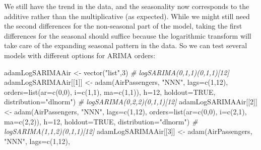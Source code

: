 \documentclass[
]{book}
\newenvironment{Shaded}{\begin{snugshade}}{\end{snugshade}}
\newcommand{\AttributeTok}[1]{\textcolor[rgb]{0.77,0.63,0.00}{#1}}
\newcommand{\CommentTok}[1]{\textcolor[rgb]{0.56,0.35,0.01}{\textit{#1}}}
\newcommand{\ConstantTok}[1]{\textcolor[rgb]{0.00,0.00,0.00}{#1}}
\newcommand{\DecValTok}[1]{\textcolor[rgb]{0.00,0.00,0.81}{#1}}
\newcommand{\FunctionTok}[1]{\textcolor[rgb]{0.00,0.00,0.00}{#1}}
\newcommand{\NormalTok}[1]{#1}
\newcommand{\OtherTok}[1]{\textcolor[rgb]{0.56,0.35,0.01}{#1}}
\newcommand{\StringTok}[1]{\textcolor[rgb]{0.31,0.60,0.02}{#1}}
\theoremstyle{definition}
\theoremstyle{definition}
\theoremstyle{definition}
\theoremstyle{definition}
\theoremstyle{remark}
\begin{document}
We still have the trend in the data, and the seasonality now corresponds to the additive rather than the multiplicative (as expected). While we might still need the second differences for the non-seasonal part of the model, taking the first differences for the seasonal should suffice because the logarithmic transform will take care of the expanding seasonal pattern in the data. So we can test several models with different options for ARIMA orders:

\begin{Shaded}
\begin{Highlighting}[]
\NormalTok{adamLogSARIMAAir }\OtherTok{\textless{}{-}} \FunctionTok{vector}\NormalTok{(}\StringTok{"list"}\NormalTok{,}\DecValTok{3}\NormalTok{)}
\CommentTok{\# logSARIMA(0,1,1)(0,1,1)[12]}
\NormalTok{adamLogSARIMAAir[[}\DecValTok{1}\NormalTok{]] }\OtherTok{\textless{}{-}}
  \FunctionTok{adam}\NormalTok{(AirPassengers, }\StringTok{"NNN"}\NormalTok{, }\AttributeTok{lags=}\FunctionTok{c}\NormalTok{(}\DecValTok{1}\NormalTok{,}\DecValTok{12}\NormalTok{),}
       \AttributeTok{orders=}\FunctionTok{list}\NormalTok{(}\AttributeTok{ar=}\FunctionTok{c}\NormalTok{(}\DecValTok{0}\NormalTok{,}\DecValTok{0}\NormalTok{), }\AttributeTok{i=}\FunctionTok{c}\NormalTok{(}\DecValTok{1}\NormalTok{,}\DecValTok{1}\NormalTok{), }\AttributeTok{ma=}\FunctionTok{c}\NormalTok{(}\DecValTok{1}\NormalTok{,}\DecValTok{1}\NormalTok{)),}
       \AttributeTok{h=}\DecValTok{12}\NormalTok{, }\AttributeTok{holdout=}\ConstantTok{TRUE}\NormalTok{, }\AttributeTok{distribution=}\StringTok{"dlnorm"}\NormalTok{)}
\CommentTok{\# logSARIMA(0,2,2)(0,1,1)[12]}
\NormalTok{adamLogSARIMAAir[[}\DecValTok{2}\NormalTok{]] }\OtherTok{\textless{}{-}}
  \FunctionTok{adam}\NormalTok{(AirPassengers, }\StringTok{"NNN"}\NormalTok{, }\AttributeTok{lags=}\FunctionTok{c}\NormalTok{(}\DecValTok{1}\NormalTok{,}\DecValTok{12}\NormalTok{),}
       \AttributeTok{orders=}\FunctionTok{list}\NormalTok{(}\AttributeTok{ar=}\FunctionTok{c}\NormalTok{(}\DecValTok{0}\NormalTok{,}\DecValTok{0}\NormalTok{), }\AttributeTok{i=}\FunctionTok{c}\NormalTok{(}\DecValTok{2}\NormalTok{,}\DecValTok{1}\NormalTok{), }\AttributeTok{ma=}\FunctionTok{c}\NormalTok{(}\DecValTok{2}\NormalTok{,}\DecValTok{2}\NormalTok{)),}
       \AttributeTok{h=}\DecValTok{12}\NormalTok{, }\AttributeTok{holdout=}\ConstantTok{TRUE}\NormalTok{, }\AttributeTok{distribution=}\StringTok{"dlnorm"}\NormalTok{)}
\CommentTok{\# logSARIMA(1,1,2)(0,1,1)[12]}
\NormalTok{adamLogSARIMAAir[[}\DecValTok{3}\NormalTok{]] }\OtherTok{\textless{}{-}}
  \FunctionTok{adam}\NormalTok{(AirPassengers, }\StringTok{"NNN"}\NormalTok{, }\AttributeTok{lags=}\FunctionTok{c}\NormalTok{(}\DecValTok{1}\NormalTok{,}\DecValTok{12}\NormalTok{),}

\end{Highlighting}
\end{Shaded}
\end{document}
